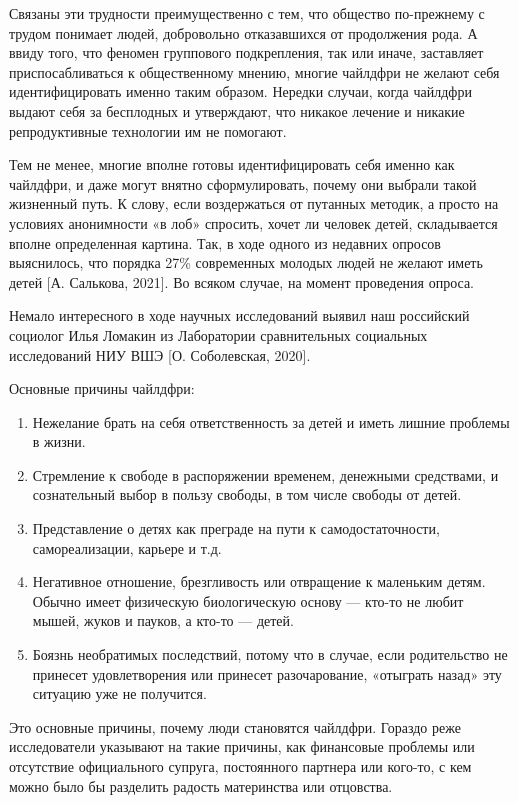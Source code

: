 Связаны эти трудности преимущественно с тем, что общество по-прежнему с трудом понимает людей, добровольно отказавшихся от продолжения рода. А ввиду того, что феномен группового подкрепления, так или иначе, заставляет приспосабливаться к общественному мнению, многие чайлдфри не желают себя идентифицировать именно таким образом. Нередки случаи, когда чайлдфри выдают себя за бесплодных и утверждают, что никакое лечение и никакие репродуктивные технологии им не помогают.

Тем не менее, многие вполне готовы идентифицировать себя именно как чайлдфри, и даже могут внятно сформулировать, почему они выбрали такой жизненный путь. К слову, если воздержаться от путанных методик, а просто на условиях анонимности «в лоб» спросить, хочет ли человек детей, складывается вполне определенная картина. Так, в ходе одного из недавних опросов выяснилось, что порядка 27\% современных молодых людей не желают иметь детей [А. Салькова, 2021]. Во всяком случае, на момент проведения опроса.

Немало интересного в ходе научных исследований выявил наш российский социолог Илья Ломакин из Лаборатории сравнительных социальных исследований НИУ ВШЭ [О. Соболевская, 2020].

Основные причины чайлдфри:
\begin{enumerate}
    \item Нежелание брать на себя ответственность за детей и иметь лишние проблемы в жизни.
    \item Стремление к свободе в распоряжении временем, денежными средствами, и сознательный выбор в пользу свободы, в том числе свободы от детей.
    \item Представление о детях как преграде на пути к самодостаточности, самореализации, карьере и т.д.
    \item Негативное отношение, брезгливость или отвращение к маленьким детям. Обычно имеет физическую биологическую основу --- кто-то не любит мышей, жуков и пауков, а кто-то --- детей.
    \item Боязнь необратимых последствий, потому что в случае, если родительство не принесет удовлетворения или принесет разочарование, «отыграть назад» эту ситуацию уже не получится.
\end{enumerate}

Это основные причины, почему люди становятся чайлдфри. Гораздо реже исследователи указывают на такие причины, как финансовые проблемы или отсутствие официального супруга, постоянного партнера или кого-то, с кем можно было бы разделить радость материнства или отцовства.

